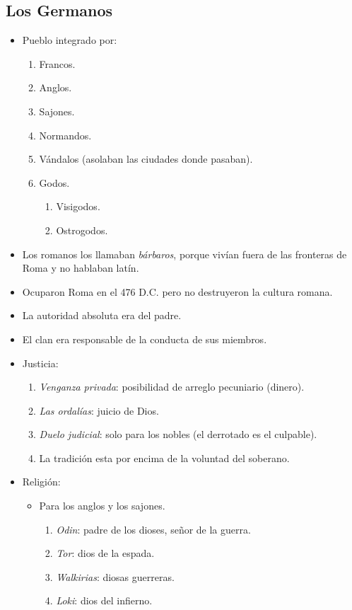 \subsection{Los Germanos}

\begin{itemize}

\item Pueblo integrado por:
\begin{enumerate}
	\item Francos.
	\item Anglos.
	\item Sajones.
	\item Normandos.
	\item Vándalos (asolaban las ciudades donde pasaban).
	\item Godos.
	\begin{enumerate}
		\item Visigodos.
		\item Ostrogodos.
	\end{enumerate}
\end{enumerate}

\item Los romanos los llamaban \emph{bárbaros}, porque vivían fuera de las fronteras de Roma y no hablaban latín.

\item Ocuparon Roma en el 476 D.C. pero no destruyeron la cultura romana.

\item La autoridad absoluta era del padre.

\item El clan era responsable de la conducta de sus miembros.

\item Justicia:
\begin{enumerate}
	\item \emph{Venganza privada}: posibilidad de arreglo pecuniario (dinero).
	\item \emph{Las ordalías}: juicio de Dios.
	\item \emph{Duelo judicial}: solo para los nobles (el derrotado es el culpable).
	\item La tradición esta por encima de la voluntad del soberano.
\end{enumerate}

\item Religión:
\begin{itemize}
	\item Para los anglos y los sajones.
	\begin{enumerate}
		\item \emph{Odin}: padre de los dioses, señor de la guerra.
		\item \emph{Tor}: dios de la espada.
		\item \emph{Walkirias}: diosas guerreras.
		\item \emph{Loki}: dios del infierno.
	\end{enumerate}
\end{itemize}

\end{itemize}